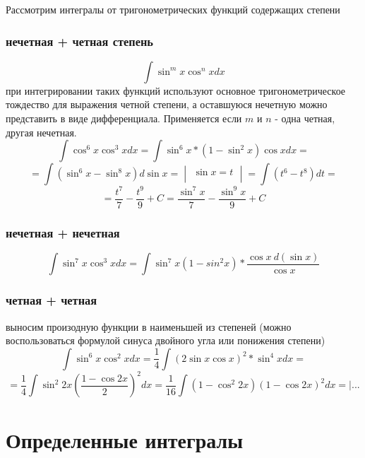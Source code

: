 \documentclass[12pt,a4paper]{article}
\begin{document}
Рассмотрим интегралы от тригонометрических функций содержащих степени
\subsubsection{нечетная + четная степень}
\[
\int \sin^m x \cos^n x dx
\]
при интегрировании таких функций используют основное тригонометрическое
тождество для выражения четной степени, а оставшуюся нечетную можно
представить в виде дифференциала.
Применяется если $m$ и $n$ - одна четная, другая нечетная.
\[
\int \cos^6 x \cos^3 x dx =
\int \sin^6 x * (1 - \sin^2 x) \cos x dx =
\]
\[
= \int (\sin^6 x - \sin^8 x)d \sin x =
\begin{vmatrix}
\sin x = t\\
\ \ 
\end{vmatrix}
= \int (t^6 - t^8)dt =
\]
\[
= \frac{t^7}{7} - \frac{t^9}{9} + C
= \frac{\sin^7 x}{7} - \frac{\sin^9 x}{9} + C
\]
\subsubsection{нечетная + нечетная}
\[
\int \sin^7 x \cos^3 x dx = \int \sin^7 x(1 - sin^2 x) *
\frac{\cos x\ d(\sin x)}{\cos x}
\]
\subsubsection{четная + четная}
выносим произодную функции в наименьшей из степеней
(можно воспользоваться формулой синуса двойного угла или
понижения степени)
\[
\int \sin^6 x \cos^2 x dx = \frac{1}{4} \int (2 \sin x \cos x)^2 *
\sin^4 x dx =
\]
\[
= \frac{1}{4} \int \sin^2 2x (\frac{1 - \cos 2x}{2})^2 dx =
\frac{1}{16} \int (1 - \cos^2 2x)(1 - \cos 2x)^2 dx =
\Bigg|... 
\]
\section{Определенные интегралы}
\end{document}
